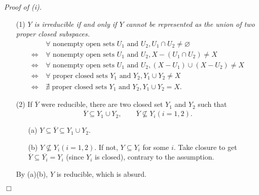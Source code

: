 \documentclass{article}
\begin{document}
\emph{Proof of (i).}
\begin{enumerate}
\item[(1)]
  \emph{$Y$ is irreducible if and only if
  $Y$ cannot be represented as the union of two proper closed subspaces.}
    \begin{align*}
      & \:
      \forall \text{ nonempty open sets } U_1 \text{ and } U_2,
      U_1 \cap U_2 \neq \varnothing \\
      \Longleftrightarrow& \:
      \forall \text{ nonempty open sets } U_1 \text{ and } U_2,
      X - (U_1 \cap U_2) \neq X \\
      \Longleftrightarrow& \:
      \forall \text{ nonempty open sets } U_1 \text{ and } U_2,
      (X - U_1) \cup (X - U_2) \neq X \\
      \Longleftrightarrow& \:
      \forall \text{ proper closed sets } Y_1 \text{ and } Y_2,
      Y_1 \cup Y_2 \neq X \\
      \Longleftrightarrow& \:
      \nexists \text{ proper closed sets } Y_1 \text{ and } Y_2,
      Y_1 \cup Y_2 = X.
    \end{align*}

\item[(2)]
  If $\overline{Y}$ were reducible, there are two closed set $Y_1$ and $Y_2$
  such that
  \[
    \overline{Y} \subseteq Y_1 \cup Y_2,
    \qquad
    \overline{Y} \not\subseteq Y_i (i = 1, 2).
  \]
    \begin{enumerate}
    \item[(a)]
      $Y \subseteq \overline{Y} \subseteq Y_1 \cup Y_2$.

    \item[(b)]
      $Y\not\subseteq Y_i (i = 1, 2)$. If not, $Y \subseteq Y_i$ for some $i$.
      Take closure to get $\overline{Y} \subseteq \overline{Y_i} = Y_i$ (since $Y_i$ is closed),
      contrary to the assumption.
    \end{enumerate}
    By (a)(b), $Y$ is reducible, which is absurd.
\end{enumerate}
$\Box$ \\
\end{document}
